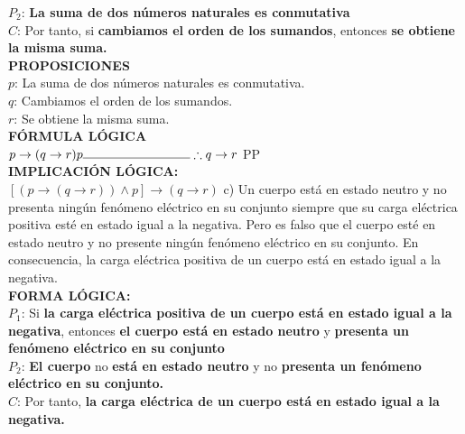\documentclass[letterpaper,12pt]{article}
\begin{document}
\begin{sloppypar}
$P_2$: \textcolor[rgb]{1,0,0}{\textbf{La suma de dos números naturales es conmutativa}}\\ 
$C$: Por tanto, si \textcolor[rgb]{0.2,0.5,0.7}{\textbf{cambiamos el orden de los sumandos}}, entonces \textcolor[rgb]{0.2,0.7,0.5}{\textbf{se obtiene la misma suma.}}
\vspace{0.3cm} \\ 
\textbf{PROPOSICIONES} \\ 
$p$: La suma de dos números naturales es conmutativa. \\ 
$q$: Cambiamos el orden de los sumandos. \\ 
$r$: Se obtiene la misma suma.
\vspace{0.3cm} \\ 
\textbf{FÓRMULA LÓGICA} \\ 
$p \rightarrow (q \rightarrow r) \\ p \\ \noindent\rule{3cm}{0.4pt} \\ \therefore q \rightarrow r $ PP
\vspace{0.3cm} \\ 
\textbf{IMPLICACIÓN LÓGICA:} \\ 
$[(p \rightarrow (q \rightarrow r)) \wedge p] \rightarrow (q \rightarrow r)$
\newpage
c) Un cuerpo está en estado neutro y no presenta ningún fenómeno eléctrico en su conjunto siempre que su
carga eléctrica positiva esté en estado igual a la negativa. Pero es falso que el cuerpo esté en estado neutro
y no presente ningún fenómeno eléctrico en su conjunto. En consecuencia, la carga eléctrica positiva de un
cuerpo está en estado igual a la negativa.
\vspace{0.3cm}\\ 
\textbf{FORMA LÓGICA:} \\ 
$P_1$: Si \textcolor[rgb]{1,0,0}{\textbf{la carga eléctrica positiva de un cuerpo está en estado igual a la negativa}}, entonces \textcolor[rgb]{0.2,0.5,0.7}{\textbf{el cuerpo está en estado neutro}} y \textcolor[rgb]{0.2,0.7,0.5}{\textbf{presenta un fenómeno eléctrico en su conjunto}} \\ 
$P_2$: \textcolor[rgb]{0.2,0.5,0.7}{\textbf{El cuerpo}} no \textcolor[rgb]{0.2,0.5,0.7}{\textbf{está en estado neutro}} y no \textcolor[rgb]{0.2,0.7,0.5}{\textbf{presenta un fenómeno eléctrico en su conjunto.}} \\ 
$C$: Por tanto, \textcolor[rgb]{1,0,0}{\textbf{la carga eléctrica de un cuerpo está en estado igual a la negativa.}}
\vspace{0.3cm}\\ 

\end{sloppypar}
\end{document}
